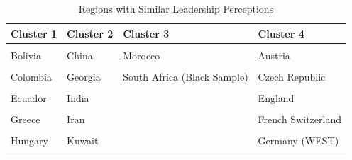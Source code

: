 \documentclass[
]{article}
\begin{document}
\begin{table}[h]
\caption{\label{tab:country_table}Regions with Similar Leadership Perceptions}
\centering
\begin{tabular}[t]{>{}l>{}l>{}l>{}l}
\toprule
Cluster 1 & Cluster 2 & Cluster 3 & Cluster 4\\
\midrule
\textcolor[HTML]{739999}{\cellcolor{gray!6}{Argentina}} & \textcolor[HTML]{000026}{\cellcolor{gray!6}{Albania}} & \textcolor[HTML]{407326}{\cellcolor{gray!6}{France}} & \textcolor[HTML]{BF7300}{\cellcolor{gray!6}{Australia}}\\
\textcolor[HTML]{739999}{Bolivia} & \textcolor[HTML]{000026}{China} & \textcolor[HTML]{407326}{Morocco} & \textcolor[HTML]{BF7300}{Austria}\\
\textcolor[HTML]{739999}{\cellcolor{gray!6}{Brazil}} & \textcolor[HTML]{000026}{\cellcolor{gray!6}{Egypt}} & \textcolor[HTML]{407326}{\cellcolor{gray!6}{Qatar}} & \textcolor[HTML]{BF7300}{\cellcolor{gray!6}{Canada (English-speaking)}}\\
\textcolor[HTML]{739999}{Colombia} & \textcolor[HTML]{000026}{Georgia} & \textcolor[HTML]{407326}{South Africa (Black Sample)} & \textcolor[HTML]{BF7300}{Czech Republic}\\
\textcolor[HTML]{739999}{\cellcolor{gray!6}{Costa Rica}} & \textcolor[HTML]{000026}{\cellcolor{gray!6}{Hong Kong}} & \textcolor[HTML]{407326}{\cellcolor{gray!6}{}} & \textcolor[HTML]{BF7300}{\cellcolor{gray!6}{Denmark}}\\
\addlinespace
\textcolor[HTML]{739999}{Ecuador} & \textcolor[HTML]{000026}{India} & \textcolor[HTML]{407326}{} & \textcolor[HTML]{BF7300}{England}\\
\textcolor[HTML]{739999}{\cellcolor{gray!6}{El Salvador}} & \textcolor[HTML]{000026}{\cellcolor{gray!6}{Indonesia}} & \textcolor[HTML]{407326}{\cellcolor{gray!6}{}} & \textcolor[HTML]{BF7300}{\cellcolor{gray!6}{Finland}}\\
\textcolor[HTML]{739999}{Greece} & \textcolor[HTML]{000026}{Iran} & \textcolor[HTML]{407326}{} & \textcolor[HTML]{BF7300}{French Switzerland}\\
\textcolor[HTML]{739999}{\cellcolor{gray!6}{Guatemala}} & \textcolor[HTML]{000026}{\cellcolor{gray!6}{Japan}} & \textcolor[HTML]{407326}{\cellcolor{gray!6}{}} & \textcolor[HTML]{BF7300}{\cellcolor{gray!6}{Germany (EAST)}}\\
\textcolor[HTML]{739999}{Hungary} & \textcolor[HTML]{000026}{Kuwait} & \textcolor[HTML]{407326}{} & \textcolor[HTML]{BF7300}{Germany (WEST)}\\
\addlinespace
\textcolor[HTML]{739999}{\cellcolor{gray!6}{Israel}} & \textcolor[HTML]{000026}{\cellcolor{gray!6}{Malaysia}} & \textcolor[HTML]{407326}{\cellcolor{gray!6}{}} & \textcolor[HTML]{BF7300}{\cellcolor{gray!6}{Ireland}}\\

\end{tabular}
\end{table}
\end{document}

